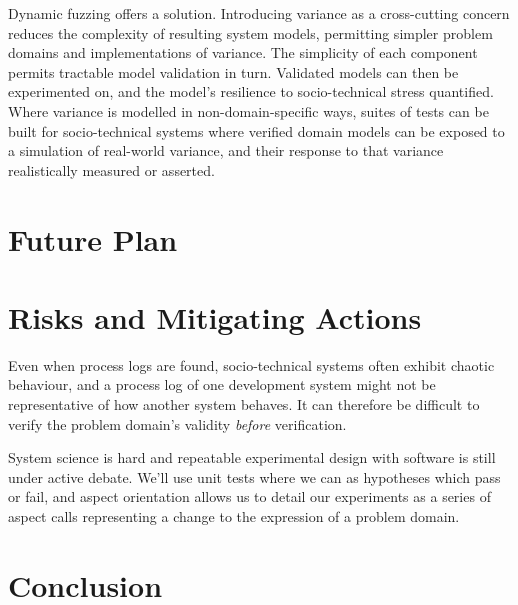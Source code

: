 \documentclass[draft]{article}
\begin{document}
Dynamic fuzzing offers a solution. Introducing variance as a cross-cutting
concern reduces the complexity of resulting system models, permitting simpler
problem domains and implementations of variance. The simplicity of each
component permits tractable model validation in turn. Validated models can then
be experimented on, and the model's resilience to socio-technical stress
quantified. Where variance is modelled in non-domain-specific ways, suites of
tests can be built for socio-technical systems where verified domain models can
be exposed to a simulation of real-world variance, and their response to that
variance realistically measured or asserted.\par



\section{Future Plan}
\label{sec:future_plan}








\section{Risks and Mitigating Actions}
\label{sec:risks}


Even when process logs are found, socio-technical systems often exhibit chaotic
behaviour, and a process log of one development system might not be
representative of how another system behaves. It can therefore be difficult to
verify the problem domain's validity \emph{before} verification.

System science is hard and repeatable experimental design with software is still
under active debate. We'll use unit tests where we can as hypotheses which pass
or fail, and aspect orientation allows us to detail our experiments as a series
of aspect calls representing a change to the expression of a problem domain. 


\section{Conclusion}
\label{sec:concluion}















\end{document}
